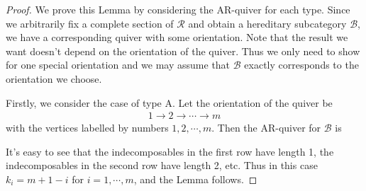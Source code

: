 \documentclass[12pt]{amsart}
\begin{document}
\begin{proof}
    We prove this Lemma by considering the AR-quiver for each type.
    Since we arbitrarily fix a complete section of $\mathcal{R}$ and obtain a hereditary subcategory $\mathcal{B}$, we have a corresponding quiver with some orientation.
    Note that the result we want doesn't depend on the orientation of the quiver.
    Thus we only need to show for one special orientation and we may assume that $\mathcal{B}$ exactly corresponds to the orientation we choose. 

    Firstly, we consider the case of type A.
    Let the orientation of the quiver be 
    \begin{align*}
        1 \rightarrow 2 \rightarrow \cdots \rightarrow m
    \end{align*}
    with the vertices labelled by numbers $1,2,\cdots,m$.
    Then the AR-quiver for $\mathcal{B}$ is
    
   

It's easy to see that the indecomposables in the first row have length 1, the indecomposables in the second row have length 2, etc.
Thus in this case $k_i=m+1-i$ for $i=1,\cdots,m$, and the Lemma follows.


\end{proof}
\end{document}
